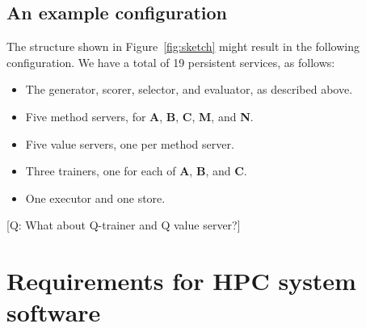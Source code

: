 \documentclass[10pt]{article}
\newcommand\q[1]{{\color{blue}[Q: #1]}}
\begin{document}
\subsection{An example configuration}

The structure shown in Figure~\ref{fig:sketch} might result in the following configuration. 
We have a total of 19 persistent services, as follows:
\begin{itemize}\itemsep-0.2em
\item
The generator, scorer, selector, and evaluator, as described above.
\item
Five method servers, for \textbf{A}, \textbf{B}, \textbf{C}, \textbf{M}, and \textbf{N}.
\item
Five value servers, one per method server.
\item
Three trainers, one for each of \textbf{A}, \textbf{B}, and \textbf{C}.
\item
One executor and one store. 
\end{itemize}

\q{What about Q-trainer and Q value server?}











\section{Requirements for HPC system software}
\end{document}
